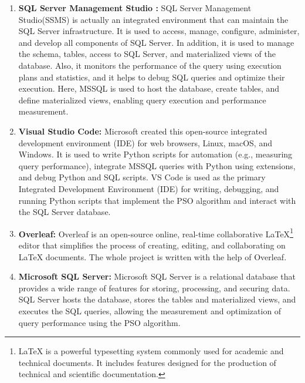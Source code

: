 \begin{enumerate}[label=(\roman*)]
\item\textbf{SQL Server Management Studio :} SQL Server Management Studio(SSMS) is actually an integrated environment that can maintain the SQL Server infrastructure. It is used to access, manage, configure, administer, and develop all components of SQL Server. In addition, it is used to manage the schema, tables, access to SQL Server, and materialized views of the database. Also, it monitors the performance of the query using execution plans and statistics, and it helps to debug SQL queries and optimize their execution. Here, MSSQL is used to host the database, create tables, and define materialized views, enabling query execution and performance measurement.


\item\textbf{{Visual Studio Code:}} Microsoft created this open-source integrated development environment (IDE) for web browsers, Linux, macOS, and Windows. It is used to write Python scripts for automation (e.g., measuring query performance), integrate MSSQL queries with Python using extensions, and debug Python and SQL scripts. VS Code is used as the primary Integrated Development Environment (IDE) for writing, debugging, and running Python scripts that implement the PSO algorithm and interact with the SQL Server database.

\item\textbf{Overleaf:} Overleaf is an open-source online, real-time collaborative LaTeX\footnote{LaTeX is a powerful typesetting system commonly used for academic and technical documents. It includes features designed for the production of technical and scientific documentation.} editor that simplifies the process of creating, editing, and collaborating on LaTeX documents. The whole project is written with the help of Overleaf.

\item\textbf{Microsoft SQL Server:} Microsoft SQL Server is a relational database that provides a wide range of features for storing, processing, and securing data. SQL Server hosts the database, stores the tables and materialized views, and executes the SQL queries, allowing the measurement and optimization of query performance using the PSO algorithm.



\end{enumerate}
